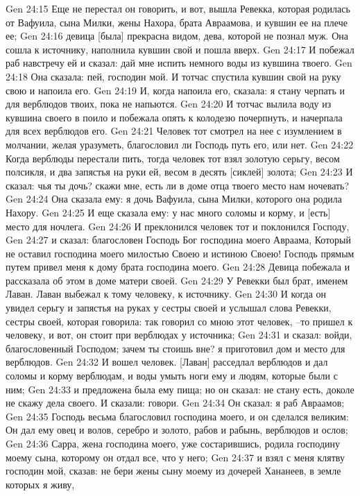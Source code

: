 Gen 24:15  Еще не перестал он говорить, и вот, вышла Ревекка, которая родилась от Вафуила, сына Милки, жены Нахора, брата Авраамова, и кувшин ее на плече ее;
Gen 24:16  девица [была] прекрасна видом, дева, которой не познал муж. Она сошла к источнику, наполнила кувшин свой и пошла вверх.
Gen 24:17  И побежал раб навстречу ей и сказал: дай мне испить немного воды из кувшина твоего.
Gen 24:18  Она сказала: пей, господин мой. И тотчас спустила кувшин свой на руку свою и напоила его.
Gen 24:19  И, когда напоила его, сказала: я стану черпать и для верблюдов твоих, пока не напьются.
Gen 24:20  И тотчас вылила воду из кувшина своего в поило и побежала опять к колодезю почерпнуть, и начерпала для всех верблюдов его.
Gen 24:21  Человек тот смотрел на нее с изумлением в молчании, желая уразуметь, благословил ли Господь путь его, или нет.
Gen 24:22  Когда верблюды перестали пить, тогда человек тот взял золотую серьгу, весом полсикля, и два запястья на руки ей, весом в десять [сиклей] золота;
Gen 24:23  И сказал: чья ты дочь? скажи мне, есть ли в доме отца твоего место нам ночевать?
Gen 24:24  Она сказала ему: я дочь Вафуила, сына Милки, которого она родила Нахору.
Gen 24:25  И еще сказала ему: у нас много соломы и корму, и [есть] место для ночлега.
Gen 24:26  И преклонился человек тот и поклонился Господу,
Gen 24:27  и сказал: благословен Господь Бог господина моего Авраама, Который не оставил господина моего милостью Своею и истиною Своею! Господь прямым путем привел меня к дому брата господина моего.
Gen 24:28  Девица побежала и рассказала об этом в доме матери своей.
Gen 24:29  У Ревекки был брат, именем Лаван. Лаван выбежал к тому человеку, к источнику.
Gen 24:30  И когда он увидел серьгу и запястья на руках у сестры своей и услышал слова Ревекки, сестры своей, которая говорила: так говорил со мною этот человек, --то пришел к человеку, и вот, он стоит при верблюдах у источника;
Gen 24:31  и сказал: войди, благословенный Господом; зачем ты стоишь вне? я приготовил дом и место для верблюдов.
Gen 24:32  И вошел человек. [Лаван] расседлал верблюдов и дал соломы и корму верблюдам, и воды умыть ноги ему и людям, которые были с ним;
Gen 24:33  и предложена была ему пища; но он сказал: не стану есть, доколе не скажу дела своего. И сказали: говори.
Gen 24:34  Он сказал: я раб Авраамов;
Gen 24:35  Господь весьма благословил господина моего, и он сделался великим: Он дал ему овец и волов, серебро и золото, рабов и рабынь, верблюдов и ослов;
Gen 24:36  Сарра, жена господина моего, уже состарившись, родила господину моему сына, которому он отдал все, что у него;
Gen 24:37  и взял с меня клятву господин мой, сказав: не бери жены сыну моему из дочерей Хананеев, в земле которых я живу,
